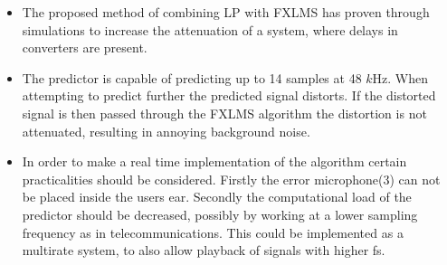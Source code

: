 \large
\begin{itemize}
\item The proposed method of combining LP with FXLMS has proven through simulations to increase the attenuation of a system, where delays in converters are present. \\
\item The predictor is capable of predicting up to 14 samples at 48 $k$Hz. When attempting to predict further the predicted signal distorts. If the distorted signal is then passed through the FXLMS algorithm the distortion is not attenuated, resulting in annoying background noise.\\
\item In order to make a real time implementation of the algorithm certain practicalities should be considered. Firstly the error microphone(3) can not be placed inside the users ear. Secondly the computational load of the predictor should be decreased, possibly by working at a lower sampling frequency as in telecommunications. This could be implemented as a multirate system, to also allow playback of signals with higher fs. 
\end{itemize}
